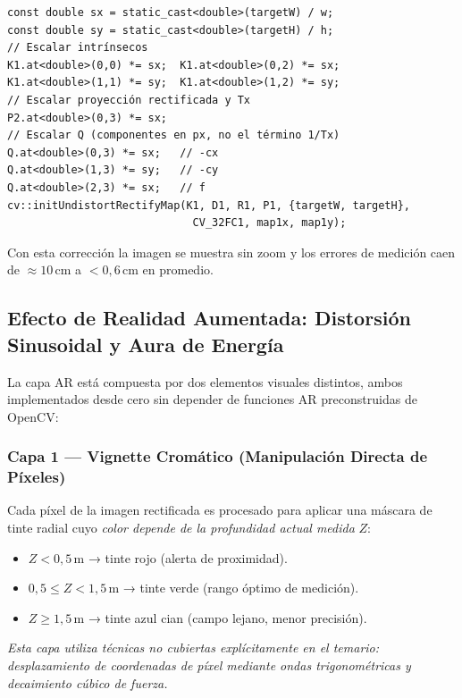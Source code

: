 \documentclass[12pt, a4paper]{article}
\begin{document}
\begin{lstlisting}[style=cppstyle, caption={Escalado de matrices en StereoCalibration.cpp.}]
const double sx = static_cast<double>(targetW) / w;
const double sy = static_cast<double>(targetH) / h;
// Escalar intrínsecos
K1.at<double>(0,0) *= sx;  K1.at<double>(0,2) *= sx;
K1.at<double>(1,1) *= sy;  K1.at<double>(1,2) *= sy;
// Escalar proyección rectificada y Tx
P2.at<double>(0,3) *= sx;
// Escalar Q (componentes en px, no el término 1/Tx)
Q.at<double>(0,3) *= sx;   // -cx
Q.at<double>(1,3) *= sy;   // -cy
Q.at<double>(2,3) *= sx;   // f
cv::initUndistortRectifyMap(K1, D1, R1, P1, {targetW, targetH},
                             CV_32FC1, map1x, map1y);
\end{lstlisting}

\noindent Con esta corrección la imagen se muestra sin zoom y los errores de medición
caen de $\approx 10$\,cm a $< 0{,}6$\,cm en promedio.

\subsection{Efecto de Realidad Aumentada: Distorsión Sinusoidal y Aura de Energía}

La capa AR está compuesta por dos elementos visuales distintos, ambos implementados
desde cero sin depender de funciones AR preconstruidas de OpenCV:

\subsubsection*{Capa 1 — Vignette Cromático (Manipulación Directa de Píxeles)}

Cada píxel de la imagen rectificada es procesado para aplicar una máscara de tinte
radial cuyo \emph{color depende de la profundidad actual medida} $Z$:

\begin{itemize}[leftmargin=2em]
  \item $Z < 0{,}5$\,m → tinte rojo (alerta de proximidad).
  \item $0{,}5 \leq Z < 1{,}5$\,m → tinte verde (rango óptimo de medición).
  \item $Z \geq 1{,}5$\,m → tinte azul cian (campo lejano, menor precisión).
\end{itemize}

\emph{Esta capa utiliza técnicas no cubiertas explícitamente en el temario: desplazamiento
de coordenadas de píxel mediante ondas trigonométricas y decaimiento cúbico de fuerza.}
\end{document}
